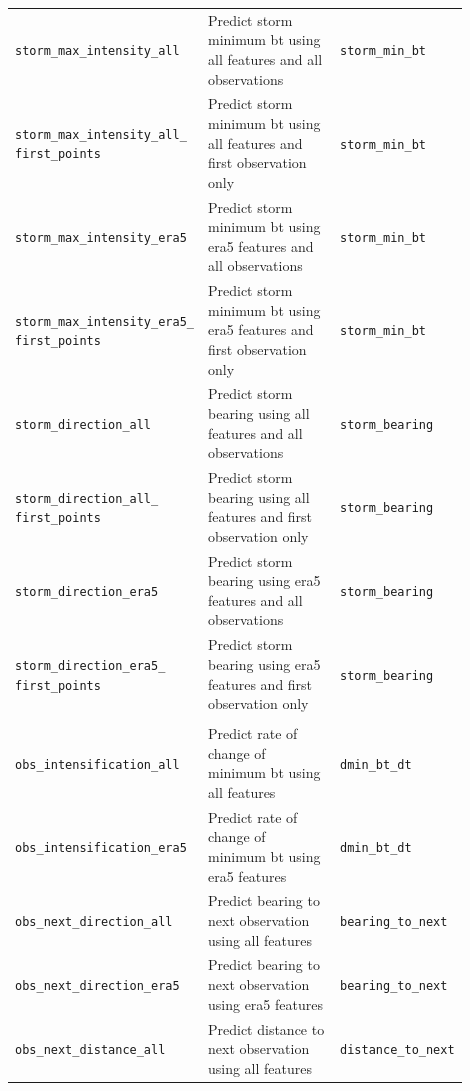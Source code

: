 {\begin{longtable}{>{\raggedright\arraybackslash}p{0.27\linewidth} p{0.43\linewidth} >{\raggedright\arraybackslash}p{0.20\linewidth}}
    \multicolumn{3}{c}{\textit{Storm Aggregate Prediction Tasks}} \\
    \midrule
    \texttt{storm\_max\_intensity\_all} & Predict storm minimum \acrfull{bt} using all features and all observations & \texttt{storm\_min\_bt} \\
    \texttt{storm\_max\_intensity\_all\_ first\_points} & Predict storm minimum \acrshort{bt} using all features and first observation only & \texttt{storm\_min\_bt} \\
    \texttt{storm\_max\_intensity\_era5} & Predict storm minimum \acrshort{bt} using \acrshort{era5} features and all observations & \texttt{storm\_min\_bt} \\
    \texttt{storm\_max\_intensity\_era5\_ first\_points} & Predict storm minimum \acrshort{bt} using \acrshort{era5} features and first observation only & \texttt{storm\_min\_bt} \\
    \texttt{storm\_direction\_all} & Predict storm bearing using all features and all observations & \texttt{storm\_bearing} \\
    \texttt{storm\_direction\_all\_ first\_points} & Predict storm bearing using all features and first observation only & \texttt{storm\_bearing} \\
    \texttt{storm\_direction\_era5} & Predict storm bearing using \acrshort{era5} features and all observations & \texttt{storm\_bearing} \\
    \texttt{storm\_direction\_era5\_ first\_points} & Predict storm bearing using \acrshort{era5} features and first observation only & \texttt{storm\_bearing} \\
    \midrule
    \multicolumn{3}{c}{\textit{Immediate Characteristic Prediction Tasks}} \\
    \midrule
    \texttt{obs\_intensification\_all} & Predict rate of change of minimum \acrshort{bt} using all features & \texttt{dmin\_bt\_dt} \\
    \texttt{obs\_intensification\_era5} & Predict rate of change of minimum \acrshort{bt} using \acrshort{era5} features & \texttt{dmin\_bt\_dt} \\
    \texttt{obs\_next\_direction\_all} & Predict bearing to next observation using all features & \texttt{bearing\_to\_next} \\
    \texttt{obs\_next\_direction\_era5} & Predict bearing to next observation using \acrshort{era5} features & \texttt{bearing\_to\_next} \\
    \texttt{obs\_next\_distance\_all} & Predict distance to next observation using all features & \texttt{distance\_to\_next} \\

\end{longtable}}
